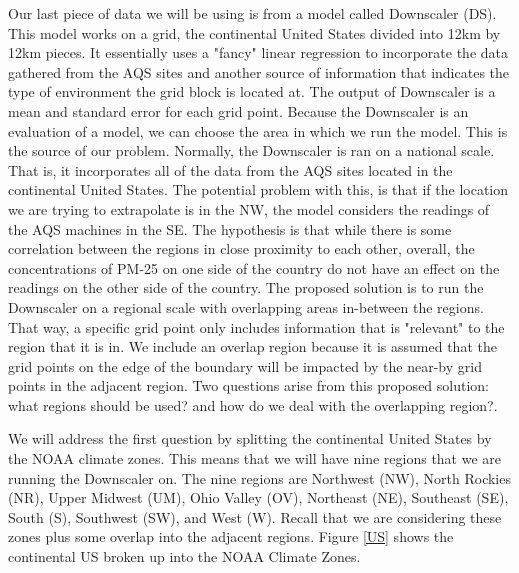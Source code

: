 Our last piece of data we will be using is from a model called Downscaler (DS).  This model works on a grid, the continental United States divided into 12km by 12km pieces.  It essentially uses a "fancy" linear regression to incorporate the data gathered from the AQS sites and another source of information that indicates the type of environment the grid block is located at.  The output of Downscaler is a mean and standard error for each grid point.  Because the Downscaler is an evaluation of a model, we can choose the area in which we run the model.  This is the source of our problem.  Normally, the Downscaler is ran on a national scale.  That is, it incorporates all of the data from the AQS sites located in the continental United States.  The potential problem with this, is that if the location we are trying to extrapolate is in the NW, the model considers the readings of the AQS machines in the SE.  The hypothesis is that while there is some correlation between the regions in close proximity to each other, overall, the concentrations of PM-25 on one side of the country do not have an effect on the readings on the other side of the country.  The proposed solution is to run the Downscaler on a regional scale with overlapping areas in-between the regions.  That way, a specific grid point only includes information that is "relevant" to the region that it is in.  We include an overlap region because it is assumed that the grid points on the edge of the boundary will be impacted by the near-by grid points in the adjacent region.  Two questions arise from this proposed solution: what regions should be used? and how do we deal with the overlapping region?.

We will address the first question by splitting the continental United States by the NOAA climate zones.  This means that we will have nine regions that we are running the Downscaler on.  The nine regions are Northwest (NW), North Rockies (NR), Upper Midwest (UM), Ohio Valley (OV), Northeast (NE), Southeast (SE), South (S), Southwest (SW), and West (W).  Recall that we are considering these zones plus some overlap into the adjacent regions.  Figure \ref{US} shows the continental US broken up into the NOAA Climate Zones.

